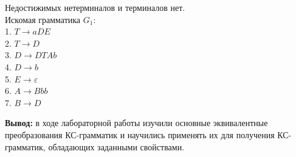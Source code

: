 \documentclass[a4paper,14pt]{extarticle}
\begin{document}
\begin{enumerate}[1.]
Недостижимых нетерминалов и терминалов нет.\\
Искомая грамматика $G_1$:\\
1. $T \rightarrow aDE$\\
2. $T \rightarrow D$\\
3. $D \rightarrow DTAb$\\
4. $D \rightarrow b$\\
5. $E \rightarrow \varepsilon$\\
6. $A \rightarrow Bbb$\\
7. $B \rightarrow D$\\


\end{enumerate}

\textbf{Вывод: } в ходе лабораторной работы изучили основные эквивалентные преобразования
КС-грамматик и научились применять их для получения
КС-грамматик, обладающих заданными свойствами.
\end{document}
